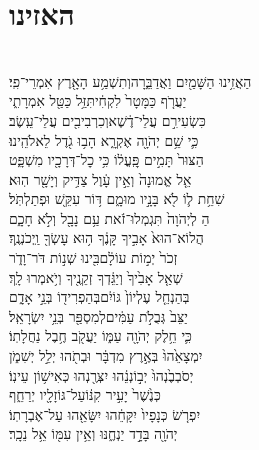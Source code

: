 \documentclass[11pt, openany]{book}
\begin{document}
\section*{האזינו}

\label{haazinu}\large
{}\vspace{12pt}\\
הַאֲזִ֥ינוּ הַשָּׁמַ֖יִם וַאֲדַבֵּ֑רָה\hfill וְתִשְׁמַ֥ע הָאָ֖רֶץ אִמְרֵי־פִֽי׃\\
יַעֲרֹ֤ף כַּמָּטָר֙ לִקְחִ֔י\hfill תִּזַּ֥ל כַּטַּ֖ל אִמְרָתִ֑י\\
כִּשְׂעִירִ֣ם עֲלֵי־דֶ֔שֶׁא\hfill וְכִרְבִיבִ֖ים עֲלֵי־עֵֽשֶׂב׃\\
כִּ֛י שֵׁ֥ם יְהֹוָ֖ה אֶקְרָ֑א \hfill הָב֥וּ גֹ֖דֶל לֵאלֹהֵֽינוּ׃\\
הַצּוּר֙ תָּמִ֣ים פׇּֽעֳל֔וֹ \hfill כִּ֥י כׇל־דְּרָכָ֖יו מִשְׁפָּ֑ט\\
אֵ֤ל אֱמוּנָה֙ וְאֵ֣ין עָ֔וֶל \hfill צַדִּ֥יק וְיָשָׁ֖ר הֽוּא׃\\
שִׁחֵ֥ת ל֛וֹ לֹ֖א בָּנָ֣יו מוּמָ֑ם \hfill דּ֥וֹר עִקֵּ֖שׁ וּפְתַלְתֹּֽל׃\\
הַ לְיְהֹוָה֙ תִּגְמְלוּ־זֹ֔את \hfill עַ֥ם נָבָ֖ל וְלֹ֣א חָכָ֑ם\\
הֲלוֹא־הוּא֙ אָבִ֣יךָ קָּנֶ֔ךָ \hfill ה֥וּא עָשְׂךָ֖ וַֽיְכֹנְנֶֽךָ׃\\
זְכֹר֙ יְמ֣וֹת עוֹלָ֔ם\hfill 	בִּ֖ינוּ שְׁנ֣וֹת דֹּר־וָדֹ֑ר\\
שְׁאַ֤ל אָבִ֙יךָ֙ וְיַגֵּ֔דְךָ \hfill זְקֵנֶ֖יךָ וְיֹ֥אמְרוּ לָֽךְ׃\\
בְּהַנְחֵ֤ל עֶלְיוֹן֙ גּוֹיִ֔ם\hfill בְּהַפְרִיד֖וֹ בְּנֵ֣י אָדָ֑ם\\
יַצֵּב֙ גְּבֻלֹ֣ת עַמִּ֔ים\hfill לְמִסְפַּ֖ר בְּנֵ֥י יִשְׂרָאֵֽל׃\\
כִּ֛י חֵ֥לֶק יְהֹוָ֖ה עַמּ֑וֹ \hfill יַעֲקֹ֖ב חֶ֥בֶל נַחֲלָתֽוֹ׃\\
יִמְצָאֵ֙הוּ֙ בְּאֶ֣רֶץ מִדְבָּ֔ר \hfill וּבְתֹ֖הוּ יְלֵ֣ל יְשִׁמֹ֑ן\\
יְסֹבְבֶ֙נְהוּ֙ יְב֣וֹנְנֵ֔הוּ \hfill יִצְּרֶ֖נְהוּ כְּאִישׁ֥וֹן עֵינֽוֹ׃\\
כְּנֶ֙שֶׁר֙ יָעִ֣יר קִנּ֔וֹ\hfill עַל־גּוֹזָלָ֖יו יְרַחֵ֑ף\\
יִפְרֹ֤שׂ כְּנָפָיו֙ יִקָּחֵ֔הוּ \hfill יִשָּׂאֵ֖הוּ עַל־אֶבְרָתֽוֹ׃\\
יְהֹוָ֖ה בָּדָ֣ד יַנְחֶ֑נּוּ \hfill וְאֵ֥ין עִמּ֖וֹ אֵ֥ל נֵכָֽר׃\\
\end{document}
